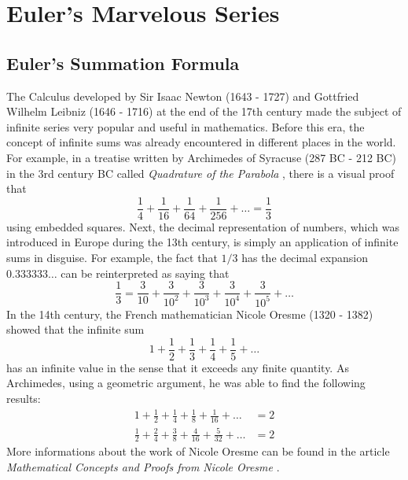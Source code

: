 \chapter{Euler's Marvelous Series}

\section{Euler's Summation Formula}

The Calculus developed by Sir Isaac Newton (1643 - 1727) and Gottfried Wilhelm Leibniz (1646 - 1716) at the end of the 17th century made the subject of infinite series very popular and useful in mathematics. Before this era, the concept of infinite sums was already encountered in different places in the world. For example, in a treatise written by Archimedes of Syracuse (287 BC - 212 BC) in the 3rd century BC called \textit{Quadrature of the Parabola} \cite{archimedes1897}, there is a visual proof that
$$\frac{1}{4} + \frac{1}{16} + \frac{1}{64} + \frac{1}{256} + \dots = \frac{1}{3}$$
using embedded squares. Next, the decimal representation of numbers, which was introduced in Europe during the 13th century, is simply an application of infinite sums in disguise. For example, the fact that $1/3$ has the decimal expansion $0.333333\dots$ can be reinterpreted as saying that
$$\frac{1}{3} = \frac{3}{10} + \frac{3}{10^2} + \frac{3}{10^3} + \frac{3}{10^4} + \frac{3}{10^5} + \dots$$
In the 14th century, the French mathematician Nicole Oresme (1320 - 1382) showed that the infinite sum
$$1 + \frac{1}{2} + \frac{1}{3} + \frac{1}{4} + \frac{1}{5} + \dots$$
has an infinite value in the sense that it exceeds any finite quantity. As Archimedes, using a geometric argument, he was able to find the following results:
\begin{align*}
    1 + \frac{1}{2} + \frac{1}{4} + \frac{1}{8} + \frac{1}{16} + \dots &= 2 \\
    \frac{1}{2} + \frac{2}{4} + \frac{3}{8} + \frac{4}{16} + \frac{5}{32} + \dots &= 2
\end{align*}
More informations about the work of Nicole Oresme can be found in the article \textit{Mathematical Concepts and Proofs from Nicole Oresme} \cite{NicoleOresme}. 

